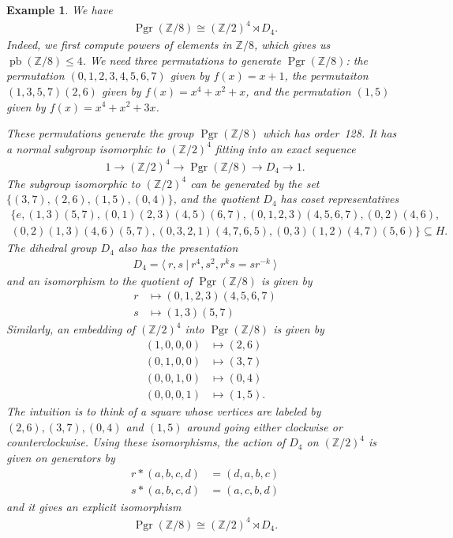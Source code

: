 \documentclass[oneside]{amsart}
\theoremstyle{nthm}
\theoremstyle{ndef}
\theoremstyle{nrem}
\newtheorem{exmp}[subsection]{Example}
\newcommand{\Z}{\mathbb{Z}}
\DeclareMathOperator{\pfb}{pb}
\DeclareMathOperator{\Pgr}{Pgr}
\begin{document}
\begin{exmp}\label{exmp:zm8}We have
    \begin{align*}
        \Pgr(\Z/8)\cong (\Z/2)^4\rtimes D_4.
    \end{align*}
    Indeed, we first compute powers of elements in $\Z/8$, which gives us $\pfb(\Z/8)\leq 4$. We need three permutations to generate $\Pgr(\Z/8)$: the permutation $(0, 1, 2, 3, 4, 5, 6, 7)$ given by $f(x) = x + 1$, the permutaiton $(1, 3, 5, 7)(2,6)$ given by $f(x) = x^4 + x^2 + x$, and the permutation $(1,5)$ given by $f(x) = x^4 + x^2 + 3x$.

    These permutations generate the group $\Pgr(\Z/8)$ which has order~128. It has a normal subgroup isomorphic to $(\Z/2)^4$ fitting into an exact sequence
    \begin{align*}
        1\to (\Z/2)^4\to \Pgr(\Z/8)\to D_4\to 1.
    \end{align*}
    The subgroup isomorphic to $(\Z/2)^4$ can be generated by the set $\{ (3,7), (2,6), (1,5), (0,4)\}$, and the quotient $D_4$ has coset representatives
    \begin{align*}
        \{ e, (1,3)(5,7), (0,1)(2,3)(4,5)(6,7), (0,1,2,3)(4,5,6,7), (0,2)(4,6),\\
        (0,2)(1,3)(4,6)(5,7), (0,3,2,1)(4,7,6,5), (0,3)(1,2)(4,7)(5,6) \}\subseteq H.
    \end{align*}
    The dihedral group $D_4$ also has the presentation
    \begin{align*}
        D_4 = \langle~ r,s ~|~ r^4, s^2, r^ks = sr^{-k} ~\rangle
    \end{align*}
    and an isomorphism to the quotient of $\Pgr(\Z/8)$ is given by
    \begin{align*}
        r &\longmapsto (0,1,2,3)(4,5,6,7)\\
        s &\longmapsto (1,3)(5,7)
    \end{align*}
    Similarly, an embedding of $(\Z/2)^4$ into $\Pgr(\Z/8)$ is given by
    \begin{align*}
        (1,0,0,0) &\longmapsto (2,6)\\
        (0,1,0,0) &\longmapsto (3,7)\\
        (0,0,1,0) &\longmapsto (0,4)\\
        (0,0,0,1) &\longmapsto (1,5).
    \end{align*}
    The intuition is to think of a square whose vertices are labeled by $(2,6), (3,7), (0,4)$ and $(1,5)$ around going either clockwise or counterclockwise. Using these isomorphisms, the action of $D_4$ on $(\Z/2)^4$ is given on generators by
    \begin{align*}
        r*(a,b,c,d) &= (d,a,b,c)\\
        s*(a,b,c,d) &= (a,c,b,d)
    \end{align*}
and it gives an explicit isomorphism
\begin{align*}
    \Pgr(\Z/8)\cong (\Z/2)^4\rtimes D_4.
\end{align*}
\end{exmp}
\end{document}
